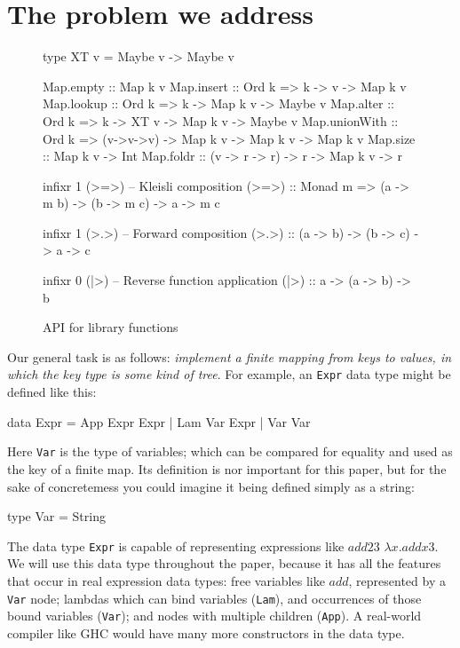 \documentclass[acmsmall]{acmart}
\theoremstyle{theorem}
\theoremstyle{definition}
\theoremstyle{remark}
\newenvironment{figurebox}{\begin{figure}}{\end{figure}}
\begin{document}
\section{The problem we address}
\begin{figurebox}
\begin{code}
type XT v = Maybe v -> Maybe v

Map.empty     :: Map k v
Map.insert    :: Ord k => k -> v -> Map k v
Map.lookup    :: Ord k => k -> Map k v -> Maybe v
Map.alter     :: Ord k => k -> XT v -> Map k v -> Maybe v
Map.unionWith :: Ord k => (v->v->v) -> Map k v -> Map k v -> Map k v
Map.size      :: Map k v -> Int
Map.foldr     :: (v -> r -> r) -> r -> Map k v -> r


infixr 1 (>=>)  -- Kleisli composition
(>=>) :: Monad m => (a -> m b) -> (b -> m c) -> a -> m c

infixr 1 (>.>)   -- Forward composition
(>.>)  :: (a -> b) -> (b -> c) -> a -> c

infixr 0 (|>)   -- Reverse function application
(|>)  :: a -> (a -> b) -> b
\end{code}
\caption{API for library functions}
\label{fig:containers} \label{fig:library}
\end{figurebox}

Our general task is as follows: \emph{implement a finite mapping from keys to values,
in which the key type is some kind of tree}.
For example, an \lstinline{Expr} data type might be defined like this:
\begin{code}
data Expr = App Expr Expr | Lam  Var Expr | Var Var
\end{code}
Here \lstinline{Var} is the type of variables; which can be compared for
equality and used as the key of a finite map.  Its definition is nor important
for this paper, but for the sake of concretemess
you could imagine it being defined simply as a string:
\begin{code}
  type Var = String
\end{code}
The data type \lstinline{Expr} is capable of representing expressions like $add 2 3$
$\lambda x. add x 3$.  We will use this data type throughout the paper, because it
has all the features that occur in real expression data types: free variables like $add$, represented by a \lstinline{Var} node;
lambdas which can bind variables (\lstinline{Lam}), and occurrences of those bound variables (\lstinline{Var}); 
and nodes with multiple children (\lstinline{App}).  A real-world compiler like GHC would have
many more constructors in the data type.
\end{document}
